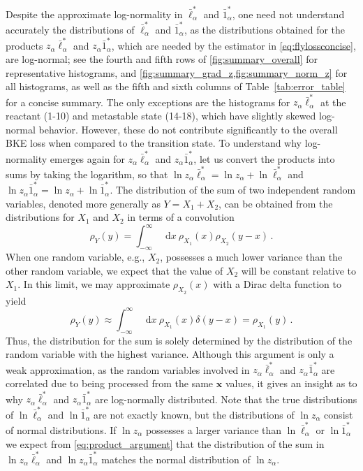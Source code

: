 \documentclass{article}
\numberwithin{equation}{section}
\def\*#1{\mathbf{#1}}
\newcommand*\diff{\mathop{}\!\mathrm{d}}
\theoremstyle{definition}
\theoremstyle{remark}
\begin{document}
Despite the approximate log-normality in $ \bar{\ell}_{\alpha}^{*} $ and $ \bar{1}_{\alpha}^{*} $, one need not understand accurately the distributions of $\bar{\ell}_{\alpha}^{*}$ and $\bar{1}_{\alpha}^{*}$, as the distributions obtained for the products $ z_{\alpha} \bar{\ell}_{\alpha}^{*} $ and $ z_{\alpha} \bar{1}_{\alpha}^{*} $, which are needed by the estimator in \cref{eq:flylossconcise}, are log-normal;  see the fourth and fifth rows of \cref{fig:summary_overall} for representative histograms, and \cref{fig:summary_grad_z,fig:summary_norm_z} for all histograms, as well as the fifth and sixth columns of Table~\ref{tab:error_table} for a concise summary. The only exceptions are the histograms for $ z_{\alpha} \bar{\ell}_{\alpha}^{*} $ at the reactant (1-10) and metastable state (14-18), which have slightly skewed log-normal behavior. However, these do not contribute significantly to the overall BKE loss when compared to the transition state.
To understand why log-normality emerges again for $ z_{\alpha} \bar{\ell}_{\alpha}^{*} $ and $ z_{\alpha} \bar{1}_{\alpha}^{*} $, let us convert the products into sums by taking the logarithm, so that 
$ \ln z_{\alpha} \bar{\ell}_{\alpha}^{*} = \ln z_{\alpha} + \ln \bar{\ell}_{\alpha}^{*} $ and $ \ln z_{\alpha} \bar{1}_{\alpha}^{*} = \ln z_{\alpha} + \ln \bar{1}_{\alpha}^{*} $. The distribution of the sum of two independent random variables, denoted more generally as $Y= X_{1} + X_{2} $, can be obtained from the distributions for $ X_{1}$ and $ X_{2}$ in terms of a convolution  
\begin{equation}
    \rho_{Y}( y) = \int_{-\infty}^{\infty} \diff x \  \rho_{X_{1}}(x ) \rho_{X_{2}}(y - x) \,.
\end{equation}
When one random variable, e.g., $ X_{2} $, possesses a much lower variance than the other random variable, we expect that the value of $ X_{2} $ will be constant relative to $ X_{1} $.
In this limit, we may approximate $ \rho_{X_{2}}( x) $ with a Dirac delta function to yield
\begin{equation}
    \rho_{Y}(y) \approx \int_{-\infty}^{\infty} \diff x \ \rho_{X_{1}}(x) \delta (y - x) = \rho_{X_{1}}(y) \,. \label{eq:product_argument}
\end{equation}
Thus, the distribution for the sum is solely determined by the distribution of the random variable with the highest variance. Although this argument is only a weak approximation, as the random variables involved in $ z_{\alpha} \bar{\ell}_{\alpha}^{*}$ and $z_{\alpha} \bar{1}_{\alpha}^{*}$ are correlated due to being processed from the same $ \* x $ values, it gives an insight as to why $ z_{\alpha} \bar{\ell}_{\alpha}^{*} $ and $ z_{\alpha} \bar{1}_{\alpha}^{*} $ are log-normally distributed. Note that the true distributions of $ \ln \bar{\ell}_{\alpha}^{*} $ and $ \ln \bar{1}_{\alpha}^{*} $ are not exactly known, but the distributions of $ \ln z_{\alpha} $ consist of normal distributions. If $ \ln z_{\alpha} $ possesses a larger variance than $ \ln \bar{\ell}_{\alpha}^{*} $ or $ \ln \bar{1}_{\alpha}^{*} $ we expect from \cref{eq:product_argument} that the distribution of the sum in $ \ln z_{\alpha} \bar{\ell}_{\alpha}^{*} $ and $ \ln z_{\alpha} \bar{1}_{\alpha}^{*} $ matches the normal distribution of $ \ln z_{\alpha}$.
\end{document}
